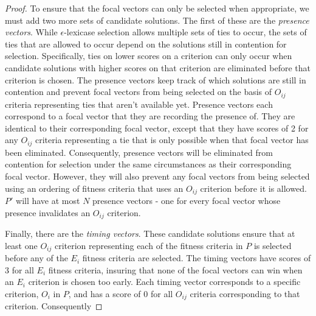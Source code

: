 \documentclass[sigconf]{acmart}
\begin{document}
\begin{proof}
To ensure that the focal vectors can only be selected when appropriate, we must add two more sets of candidate solutions. The first of these are the \textit{presence vectors}. While $\epsilon$-lexicase selection allows multiple sets of ties to occur, the sets of ties that are allowed to occur depend on the solutions still in contention for selection. Specifically, ties on lower scores on a criterion can only occur when candidate solutions with higher scores on that criterion are eliminated before that criterion is chosen. The presence vectors keep track of which solutions are still in contention and prevent focal vectors from being selected on the basis of $O_{ij}$ criteria representing ties that aren't available yet. Presence vectors each correspond to a focal vector that they are recording the presence of. They are identical to their corresponding focal vector, except that they have scores of 2 for any $O_{ij}$ criteria representing a tie that is only possible when that focal vector has been eliminated. Consequently, presence vectors will be eliminated from contention for selection under the same circumstances as their corresponding focal vector. However, they will also prevent any focal vectors from being selected using an ordering of fitness criteria that uses an $O_{ij}$ criterion before it is allowed. $P'$ will have at most $N$ presence vectors - one for every focal vector whose presence invalidates an $O_{ij}$ criterion.

Finally, there are the \textit{timing vectors}. These candidate solutions ensure that at least one $O_{ij}$ criterion representing each of the fitness criteria in $P$ is selected before any of the $E_i$ fitness criteria are selected. The timing vectors have scores of 3 for all $E_i$ fitness criteria, insuring that none of the focal vectors can win when an $E_i$ criterion is chosen too early. Each timing vector corresponds to a specific criterion, $O_i$ in $P$, and has a score of 0 for all $O_{ij}$ criteria corresponding to that criterion. Consequently



\end{proof}
\end{document}
